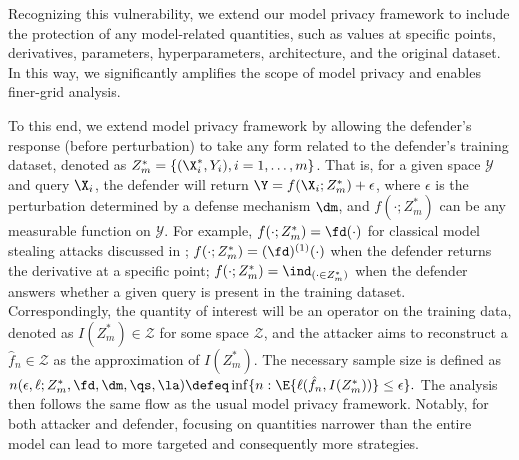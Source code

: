     Recognizing this vulnerability, we extend our model privacy framework to include the protection of any model-related quantities, such as values at specific points, derivatives, parameters, hyperparameters, architecture, and the original dataset. In this way, we significantly amplifies the scope of model privacy and enables finer-grid analysis. 
    

    To this end, we extend model privacy framework by allowing the defender's response (before perturbation) to take any form related to the defender's training dataset, denoted as $Z_m^*=\{(\X_i^*,Y_i),i=1,\dots,m\}$. That is, for a given space $\mathcal{Y}$ and query $\X_i$, the defender will return $\Y = f(\X_i;Z_m^*) + \epsilon$, where $\epsilon$ is the perturbation determined by a defense mechanism $\dm$, and $f(\cdot; Z_m^*)$ can be any measurable function on $\mathcal{Y}$. For example, $f(\cdot; Z_m^*) = \fd(\cdot)$ for classical model stealing attacks discussed in ; $f(\cdot; Z_m^*) = (\fd)^{(1)}(\cdot)$ when the defender returns the derivative at a specific point; $f(\cdot; Z_m^*) = \ind_{(\cdot \in Z_m^*)}$ when the defender answers whether a given query is present in the training dataset. Correspondingly, the quantity of interest will be an operator on the training data, denoted as $I(Z_m^*) \in \mathcal{Z}$ for some space $\mathcal{Z}$, and the attacker aims to reconstruct a $\hat{f}_n \in \mathcal{Z}$ as the approximation of $I(Z_m^*)$. The necessary sample size is defined as
         $n(\epsilon,\ell;Z_m^*,\fd,\dm,\qs,\la) \defeq \inf\{n:  \E \{\ell(\hat{f}_n, I(Z_m^*)) \}\leq \epsilon\}.$
    The analysis then follows the same flow as the usual model privacy framework. Notably, for both attacker and defender, focusing on quantities narrower than the entire model can lead to more targeted and consequently more \eco strategies.

        
  
